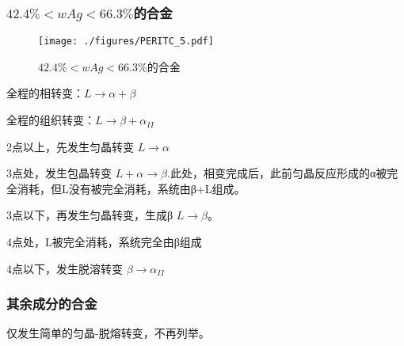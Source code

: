 





\subsubsection{$42.4\%<wAg<66.3\%$的合金}
\begin{figure}[ht]
\centering
\texttt{[image: ./figures/PERITC\_5.pdf]}
\caption{$42.4\%<wAg<66.3\%$的合金} \label{PERITC_fig5}
\end{figure}
全程的相转变：$L \rightarrow \alpha+\beta$

全程的组织转变：$L \rightarrow \beta + \alpha_{II}$

2点以上，先发生匀晶转变 $L \rightarrow \alpha$

3点处，发生包晶转变 $L + \alpha \rightarrow \beta$.此处，相变完成后，此前匀晶反应形成的α被完全消耗，但L没有被完全消耗，系统由β+L组成。

3点以下，再发生匀晶转变，生成β $L \rightarrow \beta$。

4点处，L被完全消耗，系统完全由β组成

4点以下，发生脱溶转变 $\beta \rightarrow \alpha_{II}$

\subsubsection{其余成分的合金}
仅发生简单的匀晶-脱熔转变，不再列举。

